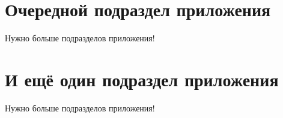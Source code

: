 \section{Очередной подраздел приложения} \label{AppendixB3}

Нужно больше подразделов приложения!

\section{И ещё один подраздел приложения} \label{AppendixB4}

Нужно больше подразделов приложения!

